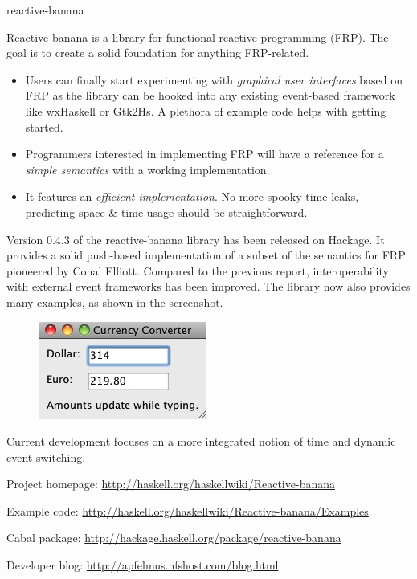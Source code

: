 \begin{hcarentry}[updated]{reactive-banana}
\makeheader

Reactive-banana is a library for functional reactive programming (FRP). The goal is to create a solid foundation for anything FRP-related.

\begin{itemize}
\item Users can finally start experimenting with \emph{graphical user interfaces} based on FRP as the library can be hooked into any existing event-based framework like wxHaskell or Gtk2Hs. A plethora of example code helps with getting started.
\item Programmers interested in implementing FRP will have a reference for a \emph{simple semantics} with a working implementation.
\item It features an \emph{efficient implementation}. No more spooky time leaks, predicting space \& time usage should be straightforward.
\end{itemize}

Version 0.4.3 of the reactive-banana library has been released on Hackage. It provides a solid push-based implementation of a subset of the semantics for FRP pioneered by Conal Elliott. Compared to the previous report, interoperability with external event frameworks has been improved. The library now also provides many examples, as shown in the screenshot.

\begin{figure}
\includegraphics{hcar-reactive-banana-01.jpg}
\end{figure}

Current development focuses on a more integrated notion of time and dynamic event switching.

\FurtherReading
\begin{compactitem}
\item Project homepage: \url{http://haskell.org/haskellwiki/Reactive-banana}
\item Example code: \url{http://haskell.org/haskellwiki/Reactive-banana/Examples}
\item Cabal package: \url{http://hackage.haskell.org/package/reactive-banana}
\item Developer blog:  \url{http://apfelmus.nfshost.com/blog.html}
\end{compactitem}
\end{hcarentry}
